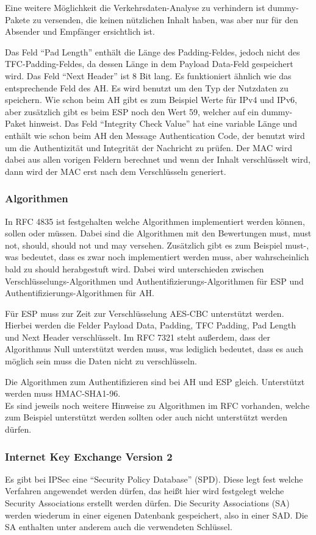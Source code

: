 \documentclass[12pt]{scrartcl}
\begin{document}
Eine weitere Möglichkeit die Verkehrsdaten-Analyse zu verhindern ist dummy-Pakete zu versenden, die keinen nützlichen Inhalt haben, was aber nur für den Absender und Empfänger ersichtlich ist.

Das Feld "`Pad Length"' enthält die Länge des Padding-Feldes, jedoch nicht des TFC-Padding-Feldes, da dessen Länge in dem Payload Data-Feld gespeichert wird.%
Das Feld "`Next Header"' ist 8 Bit lang. Es funktioniert ähnlich wie das entsprechende Feld des AH. Es wird benutzt um den Typ der Nutzdaten zu speichern. Wie schon beim AH gibt es zum Beispiel Werte für IPv4 und IPv6, aber zusätzlich gibt es beim ESP noch den Wert 59, welcher auf ein dummy-Paket hinweist. Das Feld "`Integrity Check Value"' hat eine variable Länge und enthält wie schon beim AH den Message Authentication Code, der benutzt wird um die Authentizität und Integrität der Nachricht zu prüfen. Der MAC wird dabei aus allen vorigen Feldern berechnet und wenn der Inhalt verschlüsselt wird, dann wird der MAC erst nach dem Verschlüsseln generiert. 

\subsubsection{Algorithmen}
In RFC 4835 ist festgehalten welche Algorithmen implementiert werden können, sollen oder müssen. Dabei sind die Algorithmen mit den Bewertungen must, must not, should, should not und may versehen. Zusätzlich gibt es zum Beispiel must-, was bedeutet, dass es zwar noch implementiert werden muss, aber wahrscheinlich bald zu should herabgestuft wird. Dabei wird unterschieden zwischen Verschlüsselungs-Algorithmen und Authentifizierungs-Algorithmen für ESP und Authentifizierungs-Algorithmen für AH.

Für ESP muss zur Zeit zur Verschlüsselung AES-CBC unterstützt werden. Hierbei werden die Felder Payload Data, Padding, TFC Padding, Pad Length und Next Header verschlüsselt. Im RFC 7321 steht außerdem, dass der Algorithmus Null unterstützt werden muss, was lediglich bedeutet, dass es auch möglich sein muss die Daten nicht zu verschlüsseln.

Die Algorithmen zum Authentifizieren sind bei AH und ESP gleich. Unterstützt werden muss HMAC-SHA1-96.\\
Es sind jeweils noch weitere Hinweise zu Algorithmen im RFC vorhanden, welche zum Beispiel unterstützt werden sollten oder auch nicht unterstützt werden dürfen. 
\subsubsection{Internet Key Exchange Version 2}
Es gibt bei IPSec eine ``Security Policy Database'' (SPD). Diese legt fest welche Verfahren angewendet werden dürfen, das heißt hier wird festgelegt welche Security Associations erstellt werden dürfen. Die Security Associations (SA) werden wiederum in einer eigenen Datenbank gespeichert, also in einer SAD. Die SA enthalten unter anderem auch die verwendeten Schlüssel.
\end{document}
